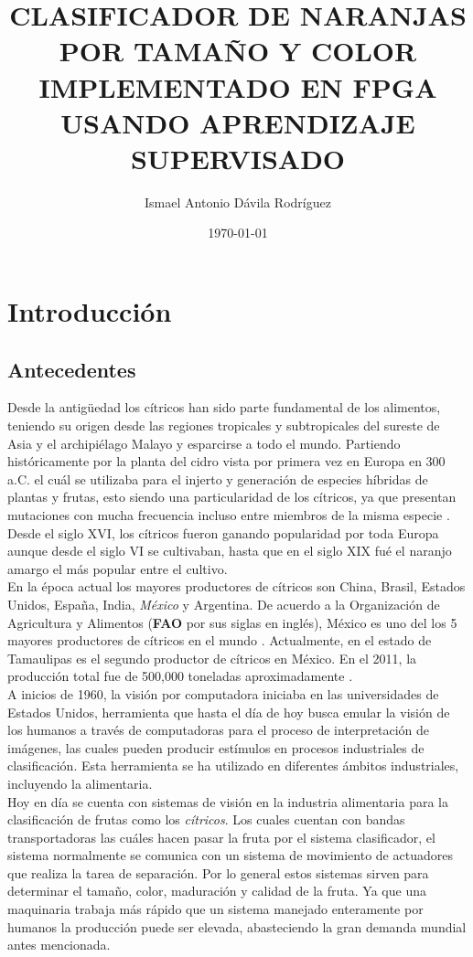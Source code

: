 \documentclass[twoside,spanish,ESP,MSc]{plantillaLabUPV}
\title	{CLASIFICADOR DE NARANJAS POR TAMAÑO  Y COLOR IMPLEMENTADO EN FPGA USANDO APRENDIZAJE SUPERVISADO}
\author      	{Ismael Antonio Dávila Rodríguez}
\date           	{\today}
\theoremstyle{definition}
\begin{document}
\makeintropages



\chapter{Introducción} \label{chap:intro}

\section{Antecedentes}

Desde la antigüedad los cítricos han sido parte fundamental de los alimentos, teniendo su origen desde las regiones tropicales y subtropicales del sureste de Asia y el archipiélago Malayo y esparcirse a todo el mundo. Partiendo históricamente por la planta del cidro vista por primera vez en Europa en 300 a.C. el cuál se utilizaba para el injerto y generación de especies híbridas de plantas y frutas, esto siendo una particularidad de los cítricos, ya que presentan mutaciones con mucha frecuencia incluso entre miembros de la misma especie \cite{anticidi}.\\

Desde el siglo XVI, los cítricos fueron ganando popularidad por toda Europa aunque desde el siglo VI se cultivaban, hasta que en el siglo XIX fué el naranjo amargo el más popular entre el cultivo.\\

En la época actual los mayores productores de cítricos son China, Brasil, Estados Unidos, España, India, \textit{México} y Argentina. De acuerdo a la Organización de Agricultura y Alimentos (\textbf{FAO} por sus siglas en inglés), México es uno del los 5 mayores productores de cítricos en el mundo \cite{FAO_2016}. Actualmente, en el estado de Tamaulipas es el segundo productor de cítricos en México. En el 2011, la producción total fue de 500,000 toneladas aproximadamente \cite{sag}.\\


A inicios de 1960, la visión por computadora iniciaba en las universidades de Estados Unidos, herramienta que hasta el día de hoy busca emular la visión de los humanos a través de computadoras para el proceso de interpretación de imágenes, las cuales pueden producir estímulos en procesos industriales de clasificación. Esta herramienta se ha utilizado en diferentes ámbitos industriales, incluyendo la alimentaria.\\

Hoy en día se cuenta con sistemas de visión en la industria alimentaria para la clasificación de frutas como los \textit{cítricos}. Los cuales cuentan con bandas transportadoras las cuáles hacen pasar la fruta por el sistema clasificador, el sistema normalmente se comunica con un sistema de movimiento de actuadores que realiza la tarea de separación. Por lo general estos sistemas sirven para determinar el tamaño, color, maduración y calidad de la fruta. Ya que una maquinaria trabaja más rápido que un sistema manejado enteramente por humanos la producción puede ser elevada, abasteciendo la gran demanda mundial antes mencionada. \\
\end{document}
